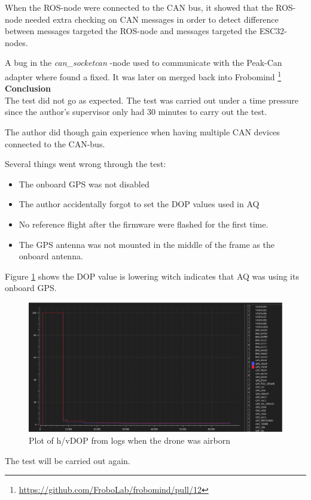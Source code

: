 When the ROS-node were connected to the CAN bus, it showed that the ROS-node needed extra checking on CAN messages in order to detect difference between messages targeted the ROS-node and messages targeted the ESC32-nodes.


A bug in the \textit{can\_socketcan} -node used to communicate with the Peak-Can adapter where found a fixed. It was later on merged back into Frobomind \footnote{\url{https://github.com/FroboLab/frobomind/pull/12}}
\textbf{Conclusion} \\

The test did not go as expected. The test was carried out under a time pressure since the author's supervisor only had 30 minutes to carry out the test.

The author did though gain experience when having multiple CAN devices connected to the CAN-bus.

Several things went wrong through the test:
\begin{itemize}
	\item The onboard GPS was not disabled
	\item The author accidentally forgot to set the DOP values used in AQ
	\item No reference flight after the firmware were flashed for the first time.
	\item The GPS antenna was not mounted in the middle of the frame as the onboard antenna.
\end{itemize}

Figure \ref{fig:qground_station_dop} shows the DOP value is lowering witch indicates that AQ was using its onboard GPS.

\begin{figure}[H]
    \center
    \includegraphics[width=1\textwidth]{graphics/test_qground_station_dop.eps}
  \caption{Plot of h/vDOP from logs when the drone was airborn}
    \label{fig:qground_station_dop}
\end{figure}

The test will be carried out again.

